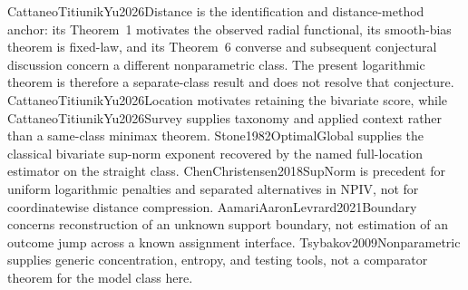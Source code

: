 CattaneoTitiunikYu2026Distance is the identification and distance-method anchor: its Theorem~1 motivates the observed radial functional, its smooth-bias theorem is fixed-law, and its Theorem~6 converse and subsequent conjectural discussion concern a different nonparametric class.  The present logarithmic theorem is therefore a separate-class result and does not resolve that conjecture.  CattaneoTitiunikYu2026Location motivates retaining the bivariate score, while CattaneoTitiunikYu2026Survey supplies taxonomy and applied context rather than a same-class minimax theorem.  Stone1982OptimalGlobal supplies the classical bivariate sup-norm exponent recovered by the named full-location estimator on the straight class.  ChenChristensen2018SupNorm is precedent for uniform logarithmic penalties and separated alternatives in NPIV, not for coordinatewise distance compression.  AamariAaronLevrard2021Boundary concerns reconstruction of an unknown support boundary, not estimation of an outcome jump across a known assignment interface.  Tsybakov2009Nonparametric supplies generic concentration, entropy, and testing tools, not a comparator theorem for the model class here.